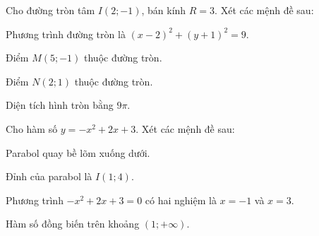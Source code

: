 
\NQuestion Cho đường tròn tâm $I(2;-1)$, bán kính $R=3$. Xét các mệnh đề sau:

\begin{SubQuestions}
\item Phương trình đường tròn là $(x-2)^2+(y+1)^2=9$.
\item Điểm $M(5;-1)$ thuộc đường tròn.
\item Điểm $N(2;1)$ thuộc đường tròn.
\item Diện tích hình tròn bằng $9\pi$.
\end{SubQuestions}

\NQuestion Cho hàm số $y=-x^2+2x+3$. Xét các mệnh đề sau:

\begin{SubQuestions}
\item Parabol quay bề lõm xuống dưới.
\item Đỉnh của parabol là $I(1;4)$.
\item Phương trình $-x^2+2x+3=0$ có hai nghiệm là $x=-1$ và $x=3$.
\item Hàm số đồng biến trên khoảng $(1;+\infty)$.
\end{SubQuestions}
